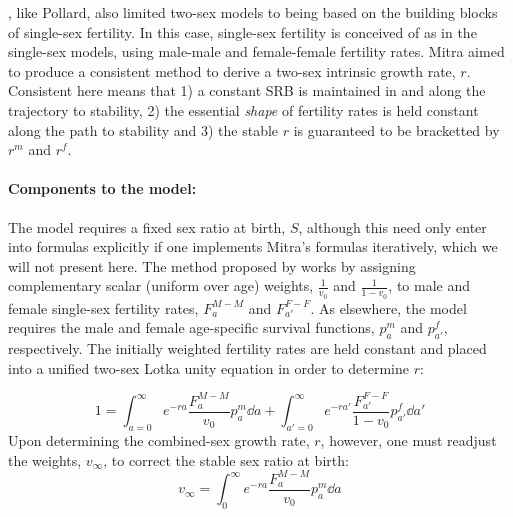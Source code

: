 \label{sec:mitraage}
\citet{mitra1978derivation}, like Pollard, also limited two-sex models to being
based on the building blocks of single-sex fertility. In this case, single-sex
fertility is conceived of as in the single-sex models, using male-male and female-female
fertility rates. Mitra aimed to produce a consistent
method to derive a two-sex intrinsic growth rate, $r$. Consistent here means 
that 1) a constant SRB is maintained in and along the trajectory to stability, 2) 
the essential \textit{shape} of fertility rates is held constant along the path 
to stability and 3) the stable $r$ is guaranteed to be bracketted by $r^m$ and $r^f$.

\paragraph{Components to the model: }
The model requires a fixed sex ratio at birth, $S$, although this need only
enter into formulas explicitly if one implements Mitra's formulas iteratively,
which we will not present here. The method proposed by \citet{mitra1978derivation} works
by assigning complementary scalar (uniform over age) weights, $\frac{1}{v_0}$ 
and $\frac{1}{1 - v_0}$, to male and female single-sex fertility rates, $F_a
^{M-M}$ and $F_{a'} ^{F-F}$. As elsewhere, the model requires the male
and female age-specific survival functions, $p_a^m$ and
$p_{a'}^f$, respectively. The initially weighted fertility rates are held
constant and placed into a unified two-sex Lotka unity equation in order to
determine $r$:

\begin{equation}
\label{eq:mitralotka}
1 = \int _{a=0} ^\infty e^{-r a} \frac{F_a ^{M-M}}{v_0} p_a^m \dd a + \int
_{a'=0} ^\infty e^{-r a'} \frac{F_{a'} ^{F-F}}{1 - v_0} p_{a'}^f \dd a'
\end{equation}
Upon determining the combined-sex growth rate, $r$, however, one must readjust
the weights, $v_\infty$, to correct the stable sex ratio at birth:
\begin{equation}
\label{eq:mitrastablev}
v_\infty = \int _0^\infty e^{-ra} \frac{F_a ^{M-M}}{v_0} p_a^m \dd a
\end{equation}

